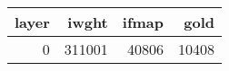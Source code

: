 \begin{tabular}{rrrr}
\toprule
 layer &  iwght &  ifmap &  gold \\
\midrule
     0 & 311001 &  40806 & 10408 \\
\bottomrule
\end{tabular}
